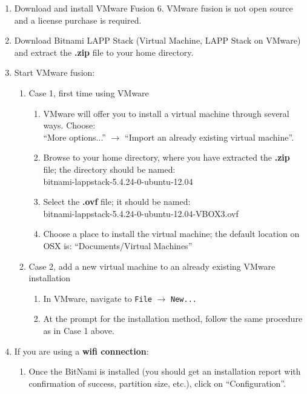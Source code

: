 \begin{enumerate}
	\item Download and install VMware Fusion 6\footnotemark {}. VMware fusion is not open source and a license purchase is required.
	\item Download Bitnami LAPP Stack\footnotemark {} (Virtual Machine, LAPP Stack on VMware) and extract the \textbf{.zip} file to your home directory.
	\item Start VMware fusion:
		\begin{enumerate}
		\item Case 1, first time using VMware
			\begin{enumerate}
			\item VMware will offer you to install a virtual machine through several ways. Choose: \\ 
				``More options...'' $\rightarrow$ ``Import an already existing virtual machine''.
			\item Browse to your home directory, where you have extracted the \textbf{.zip} file; the directory should be named:\\ 
				bitnami-lappstack-5.4.24-0-ubuntu-12.04 
			\item Select the \textbf{.ovf} file; it should be named:\\ 
				bitnami-lappstack-5.4.24-0-ubuntu-12.04-VBOX3.ovf
			\item Choose a place to install the virtual machine; the default location on OSX is: ``Documents/Virtual Machines''
			\end{enumerate}
		\item Case 2, add a new virtual machine to an already existing VMware installation
			 \begin{enumerate}
			 \item In VMware, navigate to \texttt{File} $\rightarrow$ \texttt{New...}
			 \item At the prompt for the installation method, follow the same procedure as in Case 1 above.
			 \end{enumerate}
		\end{enumerate}
	\item If you are using a \textbf{wifi connection}:
		\begin{enumerate}
		\item Once the BitNami is installed (you should get an installation report with confirmation of success, partition size, etc.), click on ``Configuration''.

\end{enumerate}
\end{enumerate}
